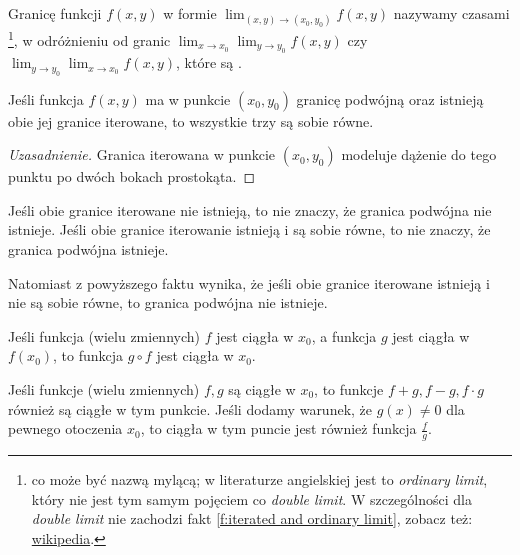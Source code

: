 Granicę funkcji $f(x, y)$ w formie $\lim_{(x, y) \to (x_0, y_0)} f(x, y)$ nazywamy czasami \footnote{co może być nazwą mylącą; w literaturze angielskiej jest to \textit{ordinary limit}, który nie jest tym samym pojęciem co \textit{double limit}. W szczególności dla \textit{double limit} nie zachodzi fakt \ref{f:iterated and ordinary limit}, zobacz też: \href{https://en.wikipedia.org/wiki/Iterated_limit\#Limit_of_function}{wikipedia}.}, w odróżnieniu od granic $\lim_{x\to x_0} \lim_{y\to y_0} f(x, y)$ czy $\lim_{y\to y_0} \lim_{x\to x_0} f(x, y)$, które są .

\begin{fact}
    \label{f:iterated and ordinary limit}
    Jeśli funkcja $f(x, y)$ ma w punkcie $(x_0, y_0)$ granicę podwójną oraz istnieją obie jej granice iterowane, to wszystkie trzy są sobie równe.
\end{fact}
\begin{proof}[Uzasadnienie]
    Granica iterowana w punkcie $(x_0, y_0)$ modeluje dążenie do tego punktu po dwóch bokach prostokąta.
\end{proof}

\begin{remark*}
    Jeśli obie granice iterowane nie istnieją, to nie znaczy, że granica podwójna nie istnieje. Jeśli obie granice iterowanie istnieją i są sobie równe, to nie znaczy, że granica podwójna istnieje.

    Natomiast z powyższego faktu wynika, że jeśli obie granice iterowane istnieją i nie są sobie równe, to granica podwójna nie istnieje.
\end{remark*}

\begin{fact}
    Jeśli funkcja (wielu zmiennych) $f$ jest ciągła w $x_0$, a funkcja $g$ jest ciągła w~$f(x_0)$, to funkcja $g\circ f$ jest ciągła w $x_0$.
\end{fact}

\begin{fact}
    Jeśli funkcje (wielu zmiennych) $f, g$ są ciągłe w $x_0$, to funkcje $f+g, f-g, f\cdot g$ również są ciągłe w tym punkcie. Jeśli dodamy warunek, że $g(x) \neq 0$ dla pewnego otoczenia $x_0$, to ciągła w tym puncie jest również funkcja $\frac{f}{g}$.
\end{fact}